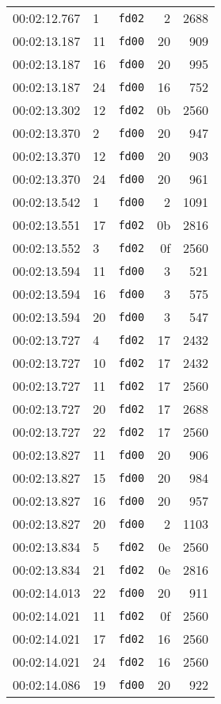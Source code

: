 \documentclass{article}
\begin{document}
\begin{longtable}{lllrr}
00:02:12.767 & 1 & \texttt{fd02} & 2 & 2688 \\
00:02:13.187 & 11 & \texttt{fd00} & 20 & 909 \\
00:02:13.187 & 16 & \texttt{fd00} & 20 & 995 \\
00:02:13.187 & 24 & \texttt{fd00} & 16 & 752 \\
00:02:13.302 & 12 & \texttt{fd02} & 0b & 2560 \\
00:02:13.370 & 2 & \texttt{fd00} & 20 & 947 \\
00:02:13.370 & 12 & \texttt{fd00} & 20 & 903 \\
00:02:13.370 & 24 & \texttt{fd00} & 20 & 961 \\
00:02:13.542 & 1 & \texttt{fd00} & 2 & 1091 \\
00:02:13.551 & 17 & \texttt{fd02} & 0b & 2816 \\
00:02:13.552 & 3 & \texttt{fd02} & 0f & 2560 \\
00:02:13.594 & 11 & \texttt{fd00} & 3 & 521 \\
00:02:13.594 & 16 & \texttt{fd00} & 3 & 575 \\
00:02:13.594 & 20 & \texttt{fd00} & 3 & 547 \\
00:02:13.727 & 4 & \texttt{fd02} & 17 & 2432 \\
00:02:13.727 & 10 & \texttt{fd02} & 17 & 2432 \\
00:02:13.727 & 11 & \texttt{fd02} & 17 & 2560 \\
00:02:13.727 & 20 & \texttt{fd02} & 17 & 2688 \\
00:02:13.727 & 22 & \texttt{fd02} & 17 & 2560 \\
00:02:13.827 & 11 & \texttt{fd00} & 20 & 906 \\
00:02:13.827 & 15 & \texttt{fd00} & 20 & 984 \\
00:02:13.827 & 16 & \texttt{fd00} & 20 & 957 \\
00:02:13.827 & 20 & \texttt{fd00} & 2 & 1103 \\
00:02:13.834 & 5 & \texttt{fd02} & 0e & 2560 \\
00:02:13.834 & 21 & \texttt{fd02} & 0e & 2816 \\
00:02:14.013 & 22 & \texttt{fd00} & 20 & 911 \\
00:02:14.021 & 11 & \texttt{fd02} & 0f & 2560 \\
00:02:14.021 & 17 & \texttt{fd02} & 16 & 2560 \\
00:02:14.021 & 24 & \texttt{fd02} & 16 & 2560 \\
00:02:14.086 & 19 & \texttt{fd00} & 20 & 922 \\

\end{longtable}
\end{document}
